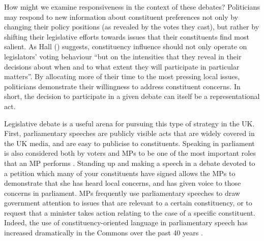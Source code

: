 \documentclass[12pt]{article}
\begin{document}
How might we examine responsiveness in the context of these debates? Politicians may respond to new information about constituent preferences not only by changing their policy positions (as revealed by the votes they cast), but rather by shifting their legislative efforts towards issues that their constituents find most salient. As Hall (\citeyear[58]{hall1996participation}) suggests, constituency influence should not only operate on legislators' voting behaviour ``but on the intensities that they reveal in their decisions about when and to what extent they will participate in particular matters''. By allocating more of their time to the most pressing local issues, politicians demonstrate their willingness to address constituent concerns. In short, the decision to participate in a given debate can itself be a representational act.

Legislative debate is a useful arena for pursuing this type of strategy in the UK. First, parliamentary speeches are publicly visible acts that are widely covered in the UK media, and are easy to publicise to constituents. Speaking in parliament is also considered both by voters and MPs to be one of the most important roles that an MP performs \citep{campbell2014should}. Standing up and making a speech in a debate devoted to a petition which many of your constituents have signed allows the MPs to demonstrate that she has heard local concerns, and has given voice to those concerns in parliament. MPs frequently use parliamentary speeches to draw government attention to issues that are relevant to a certain constituency, or to request that a minister takes action relating to the case of a specific constituent. Indeed, the use of constituency-oriented language in parliamentary speech has increased dramatically in the Commons over the past 40 years \citep{blumenau2020parliamentary}.
\end{document}
